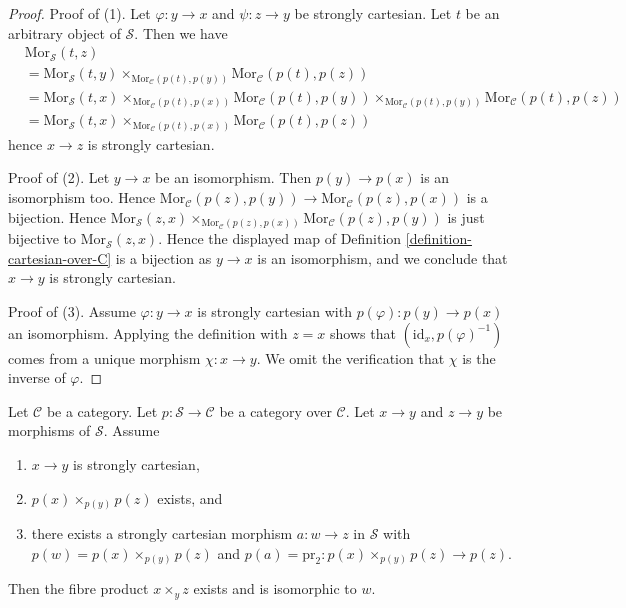 \begin{proof}
Proof of (1). Let $\varphi : y \to x$ and $\psi : z \to y$ be
strongly cartesian. Let $t$ be an arbitrary object of $\mathcal{S}$.
Then we have
\begin{align*}
& \text{Mor}_{\mathcal{S}}(t, z) \\
& =
\text{Mor}_{\mathcal{S}}(t, y)
\times_{\text{Mor}_{\mathcal{C}}(p(t), p(y))}
\text{Mor}_{\mathcal{C}}(p(t), p(z)) \\
& =
\text{Mor}_{\mathcal{S}}(t, x)
\times_{\text{Mor}_{\mathcal{C}}(p(t), p(x))}
\text{Mor}_{\mathcal{C}}(p(t), p(y))
\times_{\text{Mor}_{\mathcal{C}}(p(t), p(y))}
\text{Mor}_{\mathcal{C}}(p(t), p(z)) \\
& =
\text{Mor}_{\mathcal{S}}(t, x)
\times_{\text{Mor}_{\mathcal{C}}(p(t), p(x))}
\text{Mor}_{\mathcal{C}}(p(t), p(z))
\end{align*}
hence $x \to z$ is strongly cartesian.

\medskip\noindent
Proof of (2). Let $y \to x$ be an isomorphism. Then $p(y) \to p(x)$
is an isomorphism too. Hence
$\text{Mor}_{\mathcal{C}}(p(z), p(y)) \to
\text{Mor}_{\mathcal{C}}(p(z), p(x))$
is a bijection. Hence
$\text{Mor}_{\mathcal{S}}(z, x)
\times_{\text{Mor}_{\mathcal{C}}(p(z), p(x))}
\text{Mor}_{\mathcal{C}}(p(z), p(y))$ is just bijective to
$\text{Mor}_{\mathcal{S}}(z, x)$.
Hence the displayed map of
Definition \ref{definition-cartesian-over-C}
is a bijection as $y \to x$ is an isomorphism, and we conclude that
$x \to y$ is strongly cartesian.

\medskip\noindent
Proof of (3). Assume $\varphi : y \to x$ is strongly cartesian with
$p(\varphi) : p(y) \to p(x)$ an isomorphism. Applying the definition with
$z = x$ shows that $(\text{id}_x, p(\varphi)^{-1})$ comes from a unique
morphism $\chi : x \to y$. We omit the verification that $\chi$ is the
inverse of $\varphi$.
\end{proof}

\begin{lemma}
\label{lemma-strongly-cartesian-fibre-product}
Let $\mathcal{C}$ be a category.
Let $p : \mathcal{S} \to \mathcal{C}$ be a category over $\mathcal{C}$.
Let $x \to y$ and $z \to y$ be morphisms of $\mathcal{S}$.
Assume
\begin{enumerate}
\item $x \to y$ is strongly cartesian,
\item $p(x) \times_{p(y)} p(z)$ exists, and
\item there exists a strongly cartesian morphism $a : w \to z$ in
$\mathcal{S}$ with $p(w) = p(x) \times_{p(y)} p(z)$ and
$p(a) = \text{pr}_2 : p(x) \times_{p(y)} p(z) \to p(z)$.
\end{enumerate}
Then the fibre product $x \times_y z$ exists and is isomorphic to $w$.
\end{lemma}

